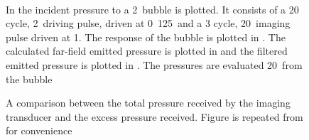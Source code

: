 \begin{figure}
  \centering
  \label{fig:FreqRatio}
  \qquad
  \\
  \centering
  \qquad
   \caption{In \protect{} the incident pressure to a \unit{2}\micro\meter\ bubble is plotted.
It consists of a 20 cycle, \unit{2}\mega\hertz\ driving pulse, driven at \unit{0.125}\mega\pascal\,
and a 3 cycle, \unit{20}\mega\hertz\ imaging pulse driven at  \unit{1}\mega\pascal.
The response of the bubble is plotted  in \protect{}.
The calculated far-field emitted pressure   is plotted in \protect{}
and the filtered emitted pressure is plotted in  \protect{}.  
The pressures are evaluated \unit{20}\milli\metre\ from the bubble }
  \label{fig:Filtered}
\end{figure}

\begin{figure}
  \centering
  \label{fig:DeltaPEffect:excess}
  \qquad
   \caption{A comparison between the total  pressure received by the imaging transducer 
     and the excess pressure received.
 Figure \protect{} is repeated from  for convenience
}
  \label{fig:DeltaPEffect}
\end{figure}



